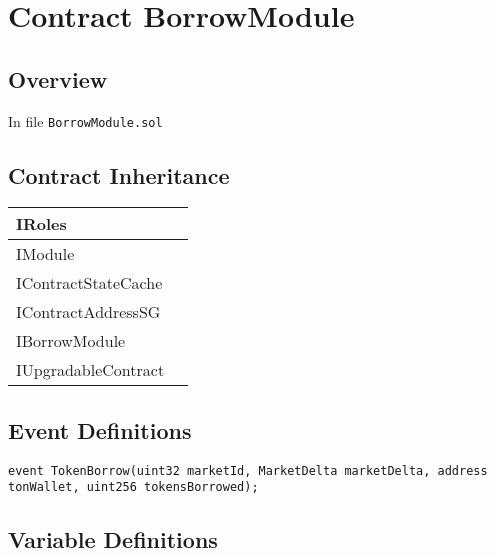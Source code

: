 
\chapter{Contract BorrowModule}

\minitoc

\section{Overview}


In file {\tt BorrowModule.sol}

\section{Contract Inheritance}


\noindent\begin{tabular}{|l|p{5cm}|}\hline
IRoles & \\\hline
IModule & \\\hline
IContractStateCache & \\\hline
IContractAddressSG & \\\hline
IBorrowModule & \\\hline
IUpgradableContract & \\\hline
\end{tabular}


\section{Event Definitions}


\begin{lstlisting}[firstnumber=16]
    event TokenBorrow(uint32 marketId, MarketDelta marketDelta, address tonWallet, uint256 tokensBorrowed);
\end{lstlisting}

\section{Variable Definitions}


